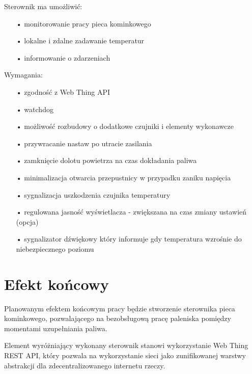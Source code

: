 \documentclass[12pt]{report}
\begin{document}
 Sterownik ma umożliwić:
 \begin{enumerate}
 \item[•] monitorowanie pracy pieca kominkowego
 \item[•] lokalne i zdalne zadawanie temperatur
 \item[•] informowanie o zdarzeniach
 \end{enumerate}
 
 Wymagania:
 \begin{enumerate}
 \item[•] zgodność z Web Thing API
 \item[•] watchdog
 \item[•] możliwość rozbudowy o dodatkowe czujniki i elementy wykonawcze
 \item[•] przywracanie nastaw po utracie zasilania
 \item[•] zamknięcie dolotu powietrza na czas dokładania paliwa
 \item[•] minimalizacja otwarcia przepustnicy w przypadku zaniku napięcia
 \item[•] sygnalizacja uszkodzenia czujnika temperatury
 \item[•] regulowana jasność wyświetlacza - zwiększana na czas zmiany ustawień (opcja)
 \item[•] sygnalizator dźwiękowy który informuje gdy temperatura wzrośnie do niebezpiecznego poziomu
 \end{enumerate}
 
 \section{Efekt końcowy}
 Planowanym efektem końcowym pracy będzie stworzenie sterownika pieca kominkowego, pozwalającego na bezobsługową pracę paleniska pomiędzy momentami uzupełniania paliwa.

 Element wyróżniający wykonany sterownik stanowi wykorzystanie Web Thing REST API, który pozwala na wykorzystanie sieci jako zunifikowanej warstwy abstrakcji dla zdecentralizowanego internetu rzeczy.
 
\end{document}
